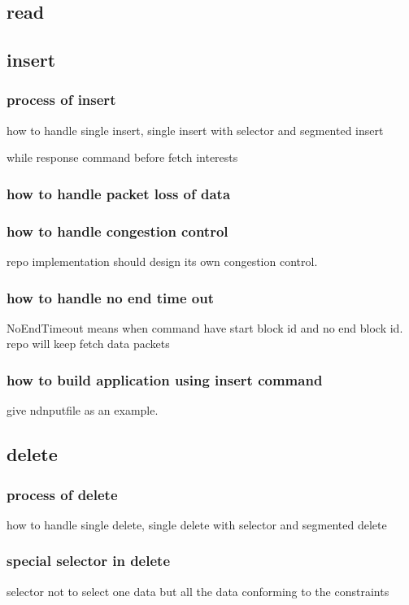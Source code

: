 \documentclass[conference]{IEEEtran}
\begin{document}
\subsection{read}

\subsection{insert}
\subsubsection{process of insert}
how to handle single insert, single insert with selector and segmented insert

while response command before fetch interests

\subsubsection{how to handle packet loss of data}

\subsubsection{how to handle congestion control}
repo implementation should design its own congestion control.

\subsubsection{how to handle no end time out}
NoEndTimeout means when command have start block id and no end block id. repo will keep fetch data packets

\subsubsection{how to build application using insert command}
give ndnputfile as an example.

\subsection{delete}

\subsubsection{process of delete}
how to handle single delete, single delete with selector and segmented delete

\subsubsection{special selector in delete}
selector not to select one data but all the data conforming to the constraints
\end{document}
